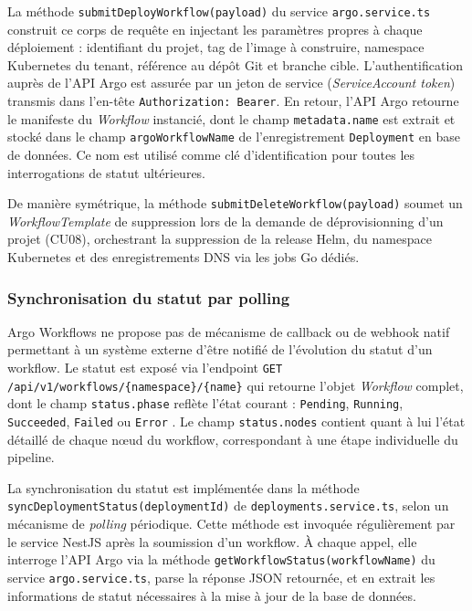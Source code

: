 La méthode \texttt{submitDeployWorkflow(payload)} du service \texttt{argo.service.ts} construit ce corps de requête en injectant les paramètres propres à chaque déploiement : identifiant du projet, tag de l'image à construire, namespace Kubernetes du tenant, référence au dépôt Git et branche cible. L'authentification auprès de l'API Argo est assurée par un jeton de service (\textit{ServiceAccount token}) transmis dans l'en-tête \texttt{Authorization: Bearer}. En retour, l'API Argo retourne le manifeste du \textit{Workflow} instancié, dont le champ \texttt{metadata.name} est extrait et stocké dans le champ \texttt{argoWorkflowName} de l'enregistrement \texttt{Deployment} en base de données. Ce nom est utilisé comme clé d'identification pour toutes les interrogations de statut ultérieures.

De manière symétrique, la méthode \texttt{submitDeleteWorkflow(payload)} soumet un \textit{WorkflowTemplate} de suppression lors de la demande de déprovisionning d'un projet (CU08), orchestrant la suppression de la release Helm, du namespace Kubernetes et des enregistrements DNS via les jobs Go dédiés.

\subsubsection*{Synchronisation du statut par polling}

Argo Workflows ne propose pas de mécanisme de callback ou de webhook natif permettant à un système externe d'être notifié de l'évolution du statut d'un workflow. Le statut est exposé via l'endpoint \texttt{GET /api/v1/workflows/\{namespace\}/\{name\}} qui retourne l'objet \textit{Workflow} complet, dont le champ \texttt{status.phase} reflète l'état courant : \texttt{Pending}, \texttt{Running}, \texttt{Succeeded}, \texttt{Failed} ou \texttt{Error} \cite{argo-rest-api}. Le champ \texttt{status.nodes} contient quant à lui l'état détaillé de chaque nœud du workflow, correspondant à une étape individuelle du pipeline.

La synchronisation du statut est implémentée dans la méthode \texttt{syncDeploymentStatus(deploymentId)} de \texttt{deployments.service.ts}, selon un mécanisme de \textit{polling} périodique. Cette méthode est invoquée régulièrement par le service NestJS après la soumission d'un workflow. À chaque appel, elle interroge l'API Argo via la méthode \texttt{getWorkflowStatus(workflowName)} du service \texttt{argo.service.ts}, parse la réponse JSON retournée, et en extrait les informations de statut nécessaires à la mise à jour de la base de données.

